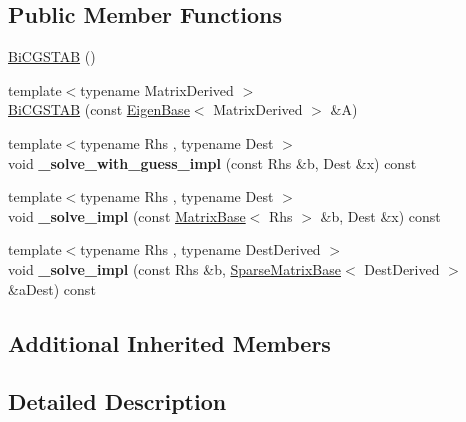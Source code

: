 \subsection*{Public Member Functions}
\begin{DoxyCompactItemize}
\item 
\mbox{\hyperlink{class_eigen_1_1_bi_c_g_s_t_a_b_ae1a0df6ef6e947256c3cb83ce7df7eda}{Bi\+C\+G\+S\+T\+AB}} ()
\item 
{\footnotesize template$<$typename Matrix\+Derived $>$ }\\\mbox{\hyperlink{class_eigen_1_1_bi_c_g_s_t_a_b_a5842afd9566e254bc727de1fd7f46362}{Bi\+C\+G\+S\+T\+AB}} (const \mbox{\hyperlink{struct_eigen_1_1_eigen_base}{Eigen\+Base}}$<$ Matrix\+Derived $>$ \&A)
\item 
\mbox{\label{class_eigen_1_1_bi_c_g_s_t_a_b_afb1eb9f5b3fa3b666f3871d5041dda11}} 
{\footnotesize template$<$typename Rhs , typename Dest $>$ }\\void {\bfseries \+\_\+solve\+\_\+with\+\_\+guess\+\_\+impl} (const Rhs \&b, Dest \&x) const
\item 
\mbox{\label{class_eigen_1_1_bi_c_g_s_t_a_b_a7fe02808db7ebde7a029c5031e8f72dc}} 
{\footnotesize template$<$typename Rhs , typename Dest $>$ }\\void {\bfseries \+\_\+solve\+\_\+impl} (const \mbox{\hyperlink{class_eigen_1_1_matrix_base}{Matrix\+Base}}$<$ Rhs $>$ \&b, Dest \&x) const
\item 
\mbox{\label{class_eigen_1_1_bi_c_g_s_t_a_b_a7c2a35dde0ddb891b4030143ed286743}} 
{\footnotesize template$<$typename Rhs , typename Dest\+Derived $>$ }\\void {\bfseries \+\_\+solve\+\_\+impl} (const Rhs \&b, \mbox{\hyperlink{class_eigen_1_1_sparse_matrix_base}{Sparse\+Matrix\+Base}}$<$ Dest\+Derived $>$ \&a\+Dest) const
\end{DoxyCompactItemize}
\subsection*{Additional Inherited Members}


\subsection{Detailed Description}
